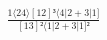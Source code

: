 \documentclass[varwidth, border=5pt]{standalone}
\begin{document}
\begin{my}
$\begin{gathered}
\scriptscriptstyle\frac{1⟨24⟩[12]³⟨4|2+3|1]}{[13]²⟨1|2+3|1]²}
\end{gathered}$
\end{my}
\end{document}
